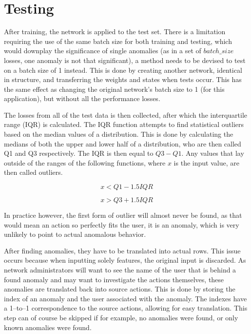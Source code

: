 \section{Testing}\label{sec:methods:testing}
After training, the network is applied to the test set. There is a limitation requiring the use of the same batch size for both training and testing, which would downplay the significance of single anomalies (as in a set of \(batch\_size\) losses, one anomaly is not that significant), a method needs to be devised to test on a batch size of 1 instead. This is done by creating another network, identical in structure, and transferring the weights and states when tests occur. This has the same effect as changing the original network's batch size to 1 (for this application), but without all the performance losses.

The losses from all of the test data is then collected, after which the interquartile range (IQR) is calculated. The IQR function attempts to find statistical outliers based on the median values of a distribution. This is done by calculating the medians of both the upper and lower half of a distribution, who are then called Q1 and Q3 respectively. The IQR is then equal to \(Q3 - Q1\). Any values that lay outside of the ranges of the following functions, where \(x\) is the input value, are then called outliers.

$$ x < Q1 - 1.5 IQR $$

$$ x > Q3 + 1.5 IQR $$

In practice however, the first form of outlier will almost never be found, as that would mean an action so perfectly fits the user, it is an anomaly, which is very unlikely to point to actual anomalous behavior.

After finding anomalies, they have to be translated into actual rows. This issue occurs because when inputting solely features, the original input is discarded. As network administrators will want to see the name of the user that is behind a found anomaly and may want to investigate the actions themselves, these anomalies are translated back into source actions. This is done by storing the index of an anomaly and the user associated with the anomaly. The indexes have a 1--to--1 correspondence to the source actions, allowing for easy translation. This step can of course be skipped if for example, no anomalies were found, or only known anomalies were found.

